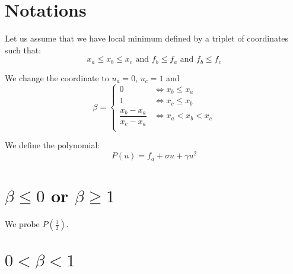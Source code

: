 \documentclass[aps,12pt]{revtex4}
\begin{document}
\section{Notations}
Let us assume that we have local minimum defined by a triplet of coordinates such that:
\begin{equation}
	x_a \leq x_b \leq x_c \text{ and } f_b \leq f_a \text{ and } f_b \leq f_c
\end{equation}

We change the coordinate to $u_a=0$, $u_c=1$ and
\begin{equation}
	\beta = \left\lbrace
	\begin{array}{cc}
	0 & \iff  x_b\leq x_a\\
	1 & \iff  x_c\leq x_b\\
	\dfrac{x_b-x_a}{x_c-x_a} & \iff x_a < x_b < x_c\\
	\end{array}
	\right.
\end{equation}

We define the polynomial:
\begin{equation}
	P(u) = f_a + \sigma u + \gamma u^2
\end{equation}

\section{$\beta\leq0$ or $\beta\geq1$}

We probe $P(\frac{1}{2})$.

\section{$0<\beta<1$}
 
\end{document}
